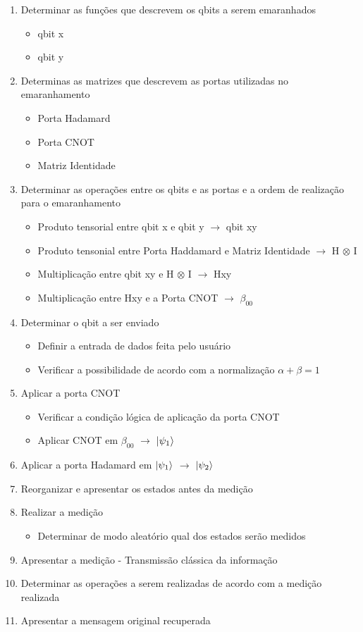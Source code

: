 \begin{enumerate}
\item Determinar as funções que descrevem os qbits a serem emaranhados
	\begin{itemize}
	\item qbit x
	\item qbit y
	\end{itemize}
\item Determinas as matrizes que descrevem as portas utilizadas no emaranhamento
	\begin{itemize}
	\item Porta Hadamard
	\item Porta CNOT
	\item Matriz Identidade
	\end{itemize}
\item Determinar as operações entre os qbits e as portas e a ordem de realização para o emaranhamento
	\begin{itemize}
	\item Produto tensorial entre qbit x e qbit y $\rightarrow$ qbit xy
	\item Produto tensonial entre Porta Haddamard e Matriz Identidade $\rightarrow$ H $\otimes$ I
	\item Multiplicação entre qbit xy e H $\otimes$ I $\rightarrow$ Hxy
	\item Multiplicação entre Hxy e a Porta CNOT $\rightarrow$ $\beta _00$
	\end{itemize}
\item Determinar o qbit a ser enviado
	\begin{itemize}
	\item Definir a entrada de dados feita pelo usuário
	\item Verificar a possibilidade de acordo com a normalização $\alpha + \beta =1$
	\end{itemize}
\item Aplicar a porta CNOT
	\begin{itemize}
	\item Verificar a condição lógica de aplicação da porta CNOT
	\item Aplicar CNOT em $\beta _00$ $\rightarrow$ $\ket{\psi _1}$
	\end{itemize}
\item Aplicar a porta Hadamard em $\ket{\psi _1}$ $\rightarrow$ $\ket{\psi _2}$
\item Reorganizar e apresentar os estados antes da medição
\item Realizar a medição
	\begin{itemize}
	\item Determinar de modo aleatório qual dos estados serão medidos
	\end{itemize}
\item Apresentar a medição - Transmissão clássica da informação
\item Determinar as operações a serem realizadas de acordo com a medição realizada
\item Apresentar a mensagem original recuperada
\end{enumerate}

